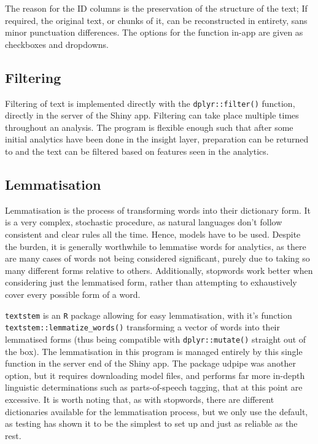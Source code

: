 \documentclass[11pt, a4paper, titlepage]{report}
\begin{document}
The reason for the ID columns is the preservation of the structure of
the text; If required, the original text, or chunks of it, can be
reconstructed in entirety, sans minor punctuation differences. The
options for the function in-app are given as checkboxes and dropdowns.

\subsection{Filtering}

Filtering of text is implemented directly with the
\texttt{dplyr::filter()} function, directly in the server of
the Shiny app. Filtering can take place multiple times throughout an
analysis. The program is flexible enough such that after some initial
analytics have been done in the insight layer, preparation can be
returned to and the text can be filtered based on features seen in the
analytics.

\subsection{Lemmatisation}

Lemmatisation is the process of transforming words into their
dictionary form. It is a very complex, stochastic procedure, as
natural languages don't follow consistent and clear rules all the
time. Hence, models have to be used. Despite the burden, it is
generally worthwhile to lemmatise words for analytics, as there are
many cases of words not being considered significant, purely due to
taking so many different forms relative to others. Additionally,
stopwords work better when considering just the lemmatised form,
rather than attempting to exhaustively cover every possible form of a
word.

\texttt{textstem} is an \texttt{R} package allowing for easy
lemmatisation, with it's function
\texttt{textstem::lemmatize_words()} transforming a vector of
words into their lemmatised forms (thus being compatible with
\texttt{dplyr::mutate()} straight out of the
box)\autocite{rinker18}. The lemmatisation in this program is managed
entirely by this single function in the server end of the Shiny app.
The package udpipe was another option, but it requires downloading
model files, and performs far more in-depth linguistic determinations
such as parts-of-speech tagging, that at this point are excessive. It
is worth noting that, as with stopwords, there are different
dictionaries available for the lemmatisation process, but we only use
the default, as testing has shown it to be the simplest to set up and
just as reliable as the rest.
\end{document}
